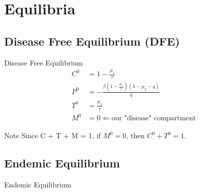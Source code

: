 \documentclass{beamer}
\begin{document}
\section{Equilibria}
\subsection{Disease Free Equilibrium (DFE)}
\begin{frame}{Disease Free Equilibrium}
    \begin{align*}
        C^{0} &= 1 - \frac{\mu_{1}}{r}\\
        P^{0} &= -\frac{\beta(1 - \frac{\mu_{1}}{r})(h - \mu_{2} - q)}{q}\\
        T^{0} &= \frac{\mu_{1}}{r}\\
        M^{0} &= 0 \Longleftarrow \text{our "disease" compartment}
    \end{align*}
    \begin{block}{Note}
    Since C + T + M = 1, if $M^{0} = 0$, then $C^{0} + T^{0} = 1$.
    \end{block}
\end{frame}

\subsection{Endemic Equilibrium}
\begin{frame}{Endemic Equilibrium}
\end{frame}
\end{document}
